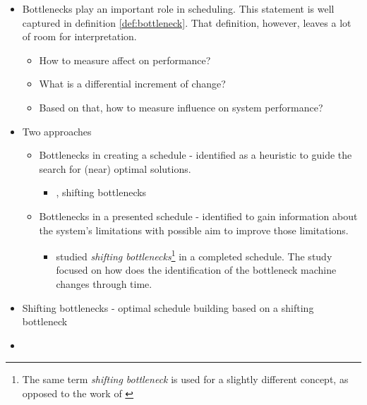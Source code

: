 \begin{itemize}
    \item Bottlenecks play an important role in scheduling. This statement is well captured
        in definition \ref{def:bottleneck}. That definition, however, leaves a lot of room for interpretation.
        \begin{itemize}
            \item How to measure affect on performance?
            \item What is a differential increment of change?
            \item Based on that, how to measure influence on system performance?
        \end{itemize}

    \item Two approaches
    \begin{itemize}
        \item Bottlenecks in creating a schedule - identified as a heuristic to guide the search
            for (near) optimal solutions.
        \begin{itemize}
            \item \citet{ADAMS1988}, shifting bottlenecks
        \end{itemize}

        \item Bottlenecks in a presented schedule - identified to gain information about the system's
            limitations with possible aim to improve those limitations.
        \begin{itemize}
            \item \citet{LAWRENCE1994} studied \emph{shifting bottlenecks}\footnote{The same term
                \emph{shifting bottleneck} is used for a slightly different concept, as opposed to the work
                of \citet{ADAMS1988}} in a completed schedule. The study focused on how does
                the identification of the bottleneck machine changes through time.

        \end{itemize}
        
    \end{itemize}

    \item Shifting bottlenecks - optimal schedule building based on a shifting bottleneck
    \item 
\end{itemize}

